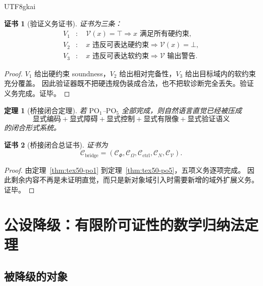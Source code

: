 \documentclass[12pt]{article}
\newtheorem{theorem}{定理}[section]
\newtheorem{Certificate}{证书}[section]
\begin{document}
\begin{CJK*}{UTF8}{gkai}
\begin{Certificate}[验证义务证书]
证书为三条：
\[
\begin{aligned}
  V_1&:\quad \mathcal V(x)=\top\Rightarrow x\text{ 满足所有硬约束},\\
  V_2&:\quad x\text{ 违反可表达硬约束}\Rightarrow\mathcal V(x)=\bot,\\
  V_3&:\quad x\text{ 违反可表达软约束}\Rightarrow \mathcal V\text{ 输出警告}.
\end{aligned}
\]
\end{Certificate}

\begin{proof}
$V_1$ 给出硬约束 soundness，$V_2$ 给出相对完备性，$V_3$ 给出目标域内的软约束充分覆盖。
因此验证器既不把硬违规伪装成合法，也不把软诊断完全丢失。验证义务完成。证毕。
\end{proof}

\begin{theorem}[桥接闭合定理]
\label{thm:tex50-po-total}
若 $\mathrm{PO}_1$--$\mathrm{PO}_5$ 全部完成，则自然语言直觉已经被压成
\[
  \text{显式编码}
  +\text{显式障碍}
  +\text{显式控制}
  +\text{显式有限像}
  +\text{显式验证语义}
\]
的闭合形式系统。
\end{theorem}

\begin{Certificate}[桥接闭合总证书]
证书为
\[
  \mathcal C_{\mathrm{bridge}}
  =
  (\mathcal C_{\Phi},\mathcal C_{\Omega},\mathcal C_{\mathrm{ctrl}},
  \mathcal C_N,\mathcal C_{\mathcal V}).
\]
\end{Certificate}

\begin{proof}
由定理~\ref{thm:tex50-po1} 到定理~\ref{thm:tex50-po5}，五项义务逐项完成。
因此剩余内容不再是未证明直觉，而只是新对象域引入时需要新增的域外扩展义务。证毕。
\end{proof}

\clearpage

\section{公设降级：有限阶可证性的数学归纳法定理}
\label{sec:tex50-axiom-downgrade}

\subsection{被降级的对象}
\label{subsec:tex50-downgrade-object}


\end{CJK*}
\end{document}
